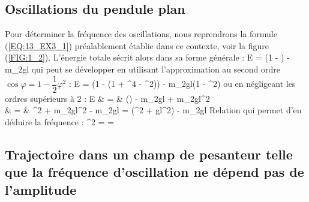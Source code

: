 \subsection{Oscillations du pendule plan}

Pour d\'eterminer la fr\'equence des oscillations, nous reprendrons la formule (\ref{EQ:13_EX3_1}) pr\'ealablement \'etablie dans ce contexte, voir la figure (\ref{FIG:1_2}). L'\'energie totale s\'ecrit alors dans sa forme g\'en\'erale :
\benn
	E = \left(1 - \right) - m_{2}gl\cos\varphi
\eenn
qui peut se d\'evelopper en utilisant l'approximation au second ordre $\cos\varphi = 1 - \dfrac{1}{2}\varphi^{2}$ :
\benn
	E = \left(1 - (1 + \varphi^{4} - \varphi^{2})\right) - m_{2}gl(1 - \varphi^{2})
\eenn
ou en n\'egligeant les ordres sup\'erieurs \`a 2 :
\bea
	E & = & \left(\right) - m_{2}gl + m_{2}gl\varphi^{2} \nonumber \\
	& = & \dot{\varphi}^{2} + m_{2}gl\varphi^{2} - m_{2}gl = \left(\dot{\varphi}^{2} + gl\varphi^{2}\right) - m_{2}gl \nonumber
\eea
Relation qui permet d'en d\'eduire la fr\'equence :
\benn
	\omega^{2} =  = 
\eenn

\subsection{Trajectoire dans un champ de pesanteur telle que la fr\'equence d'oscillation ne d\'epend pas de l'amplitude}

